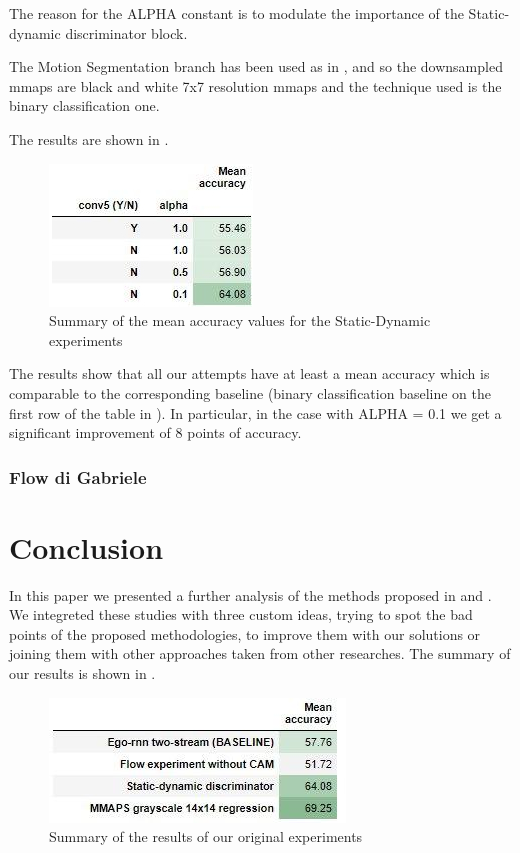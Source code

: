 \documentclass[10pt,twocolumn,hidelinks,letterpaper]{article}
\begin{document}
The reason for the ALPHA constant is to modulate the importance of the Static-dynamic discriminator block.

The Motion Segmentation branch has been used as in \cite{sparnet}, and so the downsampled mmaps are black and white 7x7 resolution mmaps and the technique used is the binary classification one.

The results are shown in .

\begin{figure}[t]
  \centering
  \includegraphics[width=.6\linewidth]{images/step3.2_table.jpg}
  \caption{Summary of the mean accuracy values for the Static-Dynamic experiments}
  \label{DS_table}
\end{figure}

The results show that all our attempts have at least a mean accuracy which is comparable to the corresponding baseline (binary classification baseline on the first row of the table in ). In particular, in the case with ALPHA = 0.1 we get a significant improvement of 8 points of accuracy.

\subsubsection{Flow di Gabriele} %

\section{Conclusion}

In this paper we presented a further analysis of the methods proposed in \cite{egornn} and \cite{sparnet}. We integreted these studies with three custom ideas, trying to spot the bad points of the proposed methodologies, to improve them with our solutions or joining them with other approaches taken from other researches. The summary of our results is shown in .

\begin{figure}[t]
  \centering
  \includegraphics[width=.8\linewidth]{images/summary_table.jpg}
  \caption{Summary of the results of our original experiments}
  \label{DS_table}
\end{figure}
\end{document}
